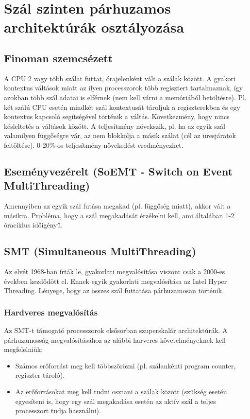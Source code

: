 \section{Szál szinten párhuzamos architektúrák osztályozása}

\subsection{Finoman szemcsézett}
A CPU 2 vagy több szálat futtat, órajelenként vált a szálak között.
A gyakori kontextus váltások miatt az ilyen processzorok több regisztert tartalmaznak, így azokban több szál adatai is elférnek (nem kell várni a memóriából betöltésre).
Pl. két szálú CPU esetén mindkét szál kontextusát tároljuk a regiszterekben és egy kontextus kapcsoló segítségével történik a váltás.
Következmény, hogy nincs késleltetés a váltások között.
A teljesítmény növekszik, pl. ha az egyik szál valamilyen függőségre vár, az nem blokkolja a másik szálat (cél az üresjáratok feltöltése).
0-20\%-os teljesítmény növekedést eredményezhet.

\subsection{Eseményvezérelt (SoEMT - Switch on Event MultiThreading)}
Amennyiben az egyik szál futása megakad (pl. függőség miatt), akkor vált a másikra.
Probléma, hogy a szál megakadását érzékelni kell, ami általában 1-2 óraciklus időigényű.

\subsection{SMT (Simultaneous MultiThreading)}
Az elvét 1968-ban írták le, gyakorlati megvalósítása viszont csak a 2000-es években kezdődött el.
Ennek egyik gyakorlati megvalósítása az Intel Hyper Threading.
Lényege, hogy az összes szál futtatása párhuzamosan történik.
\subsubsection{Hardveres megvalósítás}
Az SMT-t támogató processzorok elsősorban szuperskalár architektúrák. A párhuzamosság megvalósításához az alábbi harveres követelményeknek kell megfelelniük:
\begin{itemize}
    \item Számos erőforrást meg kell többszörözni (pl. szálankénti program counter, regiszter tároló).
    \item Az erőforrásokat meg kell tudni osztani a szálak között (szükség esetén egyesíteni is, hogy egy szál megakadása esetén az aktív szál a teljes processzort tudja használni).
\end{itemize}


